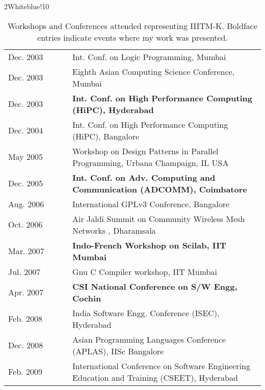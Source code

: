 \documentclass[titlepage, %
11pt, 
]{article}
\begin{document}
\begin{table}
\rowcolors%
{2}{White}{blue!10}
\setlength\extrarowheight{4pt}
\begin{tabular}%
{|p{0.25\linewidth}|p{0.75\linewidth}|}
\hline
\multicolumn{1}{|m{0.25\linewidth}|}{\centering {\bf Year}}&
\multicolumn{1}{m{0.75\linewidth}|}{\centering {\bf Meeting}}\\
\hline
Dec. 2003 & Int. Conf. on Logic Programming, Mumbai\\
Dec. 2003 & Eighth Asian Computing Science Conference, Mumbai\\
Dec. 2003 & {\bf Int. Conf. on High Performance Computing (HiPC), Hyderabad}\\
\hline
Dec. 2004 & Int. Conf. on High Performance Computing (HiPC), Bangalore\\
\hline
May 2005 & Workshop on Design Patterns in Parallel Programming, Urbana Champaign, IL USA\\
Dec. 2005 & {\bf Int. Conf. on Adv. Computing and Communication (ADCOMM), Coimbatore}\\
\hline
Aug. 2006 & International GPLv3 Conference, Bangalore\\
Oct. 2006 & Air Jaldi Summit on Community Wireless Mesh Networks , Dharamsala\\
\hline
Mar. 2007 & {\bf Indo-French Workshop on Scilab, IIT Mumbai}\\
Jul. 2007 & Gnu C Compiler workshop, IIT Mumbai\\
Apr. 2007 & {\bf CSI National Conference on S/W Engg, Cochin}\\
\hline
Feb. 2008 & India Software Engg. Conference (ISEC), Hyderabad\\
\hline
Dec. 2008 & Asian Programming Languages Conference (APLAS), IISc Bangalore\\
\hline
Feb. 2009 & International Conference on Software Engineering Education and Training (CSEET), Hyderabad\\
\hline
\end{tabular}
\caption{Workshops and Conferences attended representing IIITM-K.  Boldface entries indicate events where my work was presented.\label{tbl:conf}}
\end{table}
\end{document}
